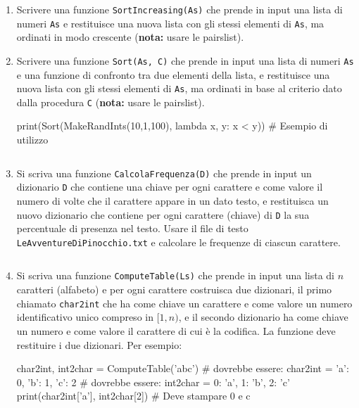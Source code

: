 \documentclass[11pt,a4]{article}
\newcommand{\mybox}[2]{$\quad$\fbox{
\begin{minipage}{#1cm}
\hfill\vspace{#2cm}
\end{minipage}
}}
\begin{document}
\begin{enumerate}
\item Scrivere una funzione {\tt SortIncreasing(As)} che prende in input una lista di numeri {\tt As} e restituisce una nuova
lista con gli stessi elementi di {\tt As}, ma ordinati in modo crescente ({\bf nota:} usare le pairslist).

\item Scrivere una funzione {\tt Sort(As, C)} che prende in input una lista di numeri {\tt As} e 
una funzione di confronto tra due elementi della lista, e restituisce una nuova
lista con gli stessi elementi di {\tt As}, ma ordinati in base al criterio dato dalla procedura {\tt C} ({\bf nota:} usare le pairslist).
\begin{python}
print(Sort(MakeRandInts(10,1,100), lambda x, y: x < y)) # Esempio di utilizzo
\end{python}
\mybox{15}{2.0}

\item Si scriva una funzione {\tt CalcolaFrequenza(D)} che prende in input un dizionario {\tt D} che contiene
una chiave per ogni carattere e come valore il numero di volte che il carattere appare in un dato testo, e restituisca
un nuovo dizionario che contiene per ogni carattere (chiave) di {\tt D} la sua percentuale di presenza nel testo.
Usare il file di testo {\tt LeAvventureDiPinocchio.txt} e calcolare le frequenze di ciascun carattere.

\mybox{15}{2.5}

\item Si scriva una funzione {\tt ComputeTable(Ls)} che prende in input una lista di $n$ caratteri (alfabeto)
e per ogni carattere costruisca due dizionari, il primo chiamato {\tt char2int} che ha come chiave un carattere
e come valore un numero identificativo unico compreso in $[1,n)$, e il secondo dizionario ha come chiave un 
numero e come valore il carattere di cui è la codifica. La funzione deve restituire i due dizionari. Per esempio:
\begin{python}
char2int, int2char = ComputeTable('abc')
# dovrebbe essere: char2int = {'a': 0, 'b': 1, 'c': 2}
# dovrebbe essere: int2char = {0: 'a', 1: 'b', 2: 'c'}
print(char2int['a'], int2char[2]) # Deve stampare 0 e c
\end{python}
\mybox{15}{2.5}


\end{enumerate}
\end{document}
